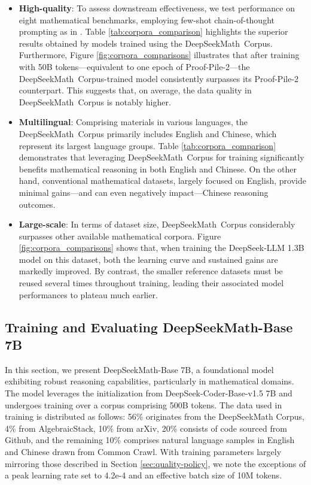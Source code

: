 \begin{itemize}[topsep=0pt]
\begin{itemize}[topsep=0pt]
    \item \textbf{High-quality}:
    To assess downstream effectiveness, we test performance on eight mathematical benchmarks, employing few-shot chain-of-thought prompting as in \cite{cot}. Table \ref{tab:corpora_comparison} highlights the superior results obtained by models trained using the DeepSeekMath~Corpus. Furthermore, Figure \ref{fig:corpora_comparisons} illustrates that after training with 50B tokens—equivalent to one epoch of Proof-Pile-2—the DeepSeekMath~Corpus-trained model consistently surpasses its Proof-Pile-2 counterpart. This suggests that, on average, the data quality in DeepSeekMath~Corpus is notably higher.
    \item \textbf{Multilingual}:
    Comprising materials in various languages, the DeepSeekMath~Corpus primarily includes English and Chinese, which represent its largest language groups. Table \ref{tab:corpora_comparison} demonstrates that leveraging DeepSeekMath~Corpus for training significantly benefits mathematical reasoning in both English and Chinese. On the other hand, conventional mathematical datasets, largely focused on English, provide minimal gains—and can even negatively impact—Chinese reasoning outcomes.
    \item \textbf{Large-scale}:
    In terms of dataset size, DeepSeekMath~Corpus considerably surpasses other available mathematical corpora. Figure \ref{fig:corpora_comparisons} shows that, when training the DeepSeek-LLM 1.3B model on this dataset, both the learning curve and sustained gains are markedly improved. By contrast, the smaller reference datasets must be reused several times throughout training, leading their associated model performances to plateau much earlier.
\end{itemize}

\subsection{Training and Evaluating DeepSeekMath-Base 7B}

In this section, we present DeepSeekMath-Base 7B, a foundational model exhibiting robust reasoning capabilities, particularly in mathematical domains. The model leverages the initialization from DeepSeek-Coder-Base-v1.5 7B \citep{deepseek-coder} and undergoes training over a corpus comprising 500B tokens. The data used in training is distributed as follows: 56\% originates from the DeepSeekMath Corpus, 4\% from AlgebraicStack, 10\% from arXiv, 20\% consists of code sourced from Github, and the remaining 10\% comprises natural language samples in English and Chinese drawn from Common Crawl. With training parameters largely mirroring those described in Section \ref{sec:quality-policy}, we note the exceptions of a peak learning rate set to 4.2e-4 and an effective batch size of 10M tokens.


\end{itemize}
